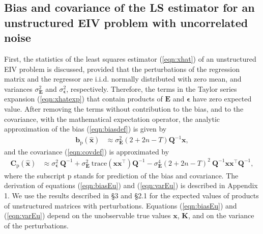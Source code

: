 \subsection{Bias and covariance of the LS estimator for an unstructured EIV problem with uncorrelated noise}

First, the statistics of the least squares estimator (\ref{eqn:xhat}) of an unstructured EIV problem is discussed, 
provided that the perturbations of the regression matrix and the regressor are i.i.d. normally distributed with zero mean, and variances $\sigma_{\mathbf{E}}^2$ and $\sigma_{\bm{\epsilon}}^2$, respectively.
Therefore, the terms in the Taylor series expansion (\ref{eqn:xhatexp}) that contain products of $\mathbf{E}$ and $\bm{\epsilon}$ have zero expected value.
 After removing the terms without contribution to the bias, and to the covariance, with the mathematical expectation operator,
the analytic approximation of the bias (\ref{eqn:biasdef}) is given by 
\begin{equation} \begin{aligned} \mathbf{b}_{\mathrm{p}} \left( \widehat{\mathbf{x}} \right) & \approx \sigma_{\mathbf{E}}^2 \left( 2 + 2n - T \right) \mathbf{Q}^{-1} \mathbf{x} , \end{aligned} \label{eqn:biasEu} \end{equation}
and the covariance (\ref{eqn:covdef}) is approximated by 
\begin{equation} \begin{aligned} \mathbf{C}_{\mathrm{p}} \left( \widehat{\mathbf{x}} \right) & \approx \sigma_{\bm{\epsilon}}^2 \ \mathbf{Q}^{-1} + \sigma_{\mathbf{E}}^2 \ \mathrm{trace} \left( \mathbf{x} \mathbf{x}^\top \right) \mathbf{Q}^{-1} - \sigma_{\mathbf{E}}^4 \left( 2 + 2n - T \right)^2 \ \mathbf{Q}^{-1} \mathbf{x} \mathbf{x}^\top \mathbf{Q}^{-1} , \end{aligned} \label{eqn:varEu} \end{equation}
where the subscript $\mathrm{p}$ stands for prediction of the bias and covariance.
The derivation of equations (\ref{eqn:biasEu}) and (\ref{eqn:varEu}) is described in Appendix 1.
We use the results described in \citep{Vaccaro94} \S 3 and \citep{Stewart90SPT} \S 2.1 for the expected values of products of unstructured matrices with perturbations.
Equations (\ref{eqn:biasEu}) and (\ref{eqn:varEu}) depend on the unobservable true values $\mathbf{x}$, $\mathbf{K}$, and on the variance of the perturbations.
